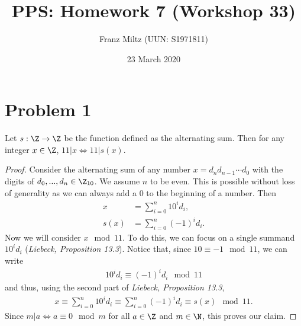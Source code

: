 \documentclass{article}
\title{PPS: Homework 7 (Workshop 33)}
\author{Franz Miltz (UUN: S1971811)}
\date{23 March 2020}
\begin{document}
\maketitle
\section*{Problem 1}
\begin{claim}
  Let $s:\Z \to \Z$ be the function defined as the alternating sum. Then for any integer $x\in\Z$, $11|x \Leftrightarrow 11|s(x)$.
\end{claim}
\begin{proof}
  Consider the alternating sum of any number $x=d_nd_{n-1}\cdots d_0$ with the digits of $d_0,...,d_n\in\Z_{10}$.
  We assume $n$ to be even. This is possible without loss of generality as we can always add a $0$ to the beginning of a number.
  Then
  \begin{align*}
    x    & = \sum_{i=0}^n 10^id_i,   \\
    s(x) & = \sum_{i=0}^n (-1)^id_i.
  \end{align*}
  Now we will consider $x\mod 11$. To do this, we can focus on a single summand $10^id_i$ (\emph{Liebeck, Proposition 13.3}).
  Notice that, since $10\equiv -1 \mod 11$, we can write
  \begin{align*}
    10^id_i \equiv (-1)^id_i \mod 11
  \end{align*}
  and thus, using the second part of \emph{Liebeck, Proposition 13.3},
  \begin{align*}
    x \equiv \sum_{i=0}^n 10^id_i \equiv \sum_{i=0}^n (-1)^id_i\equiv s(x)\mod 11.
  \end{align*}
  Since $m|a\Leftrightarrow a\equiv 0 \mod m$ for all $a\in\Z$ and $m\in\N$, this proves our claim.
\end{proof}
\end{document}
